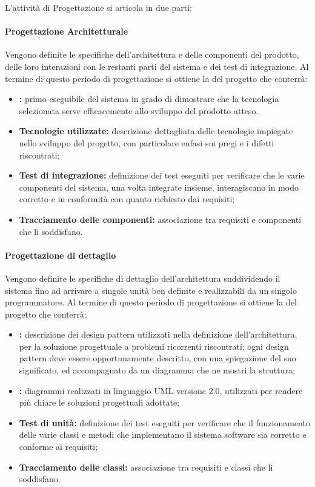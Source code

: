 L'attività di Progettazione si articola in due parti: 
\paragraph*{Progettazione Architetturale} 
Vengono definite le specifiche dell'architettura e delle componenti del prodotto, delle loro interazioni con le restanti parti del sistema e dei test di integrazione. Al termine di questo periodo di progettazione si ottiene la \textit{} del progetto che conterrà: 
\begin{itemize}
	\item \textbf{:} primo eseguibile del sistema in grado di dimostrare che la tecnologia selezionata serve efficacemente allo sviluppo del prodotto atteso.
	\item \textbf{Tecnologie utilizzate:} descrizione dettagliata delle tecnologie impiegate nello sviluppo del progetto, con particolare enfasi sui pregi e i difetti riscontrati;
	\item \textbf{Test di integrazione:} definizione dei test eseguiti per verificare che le varie componenti del sistema, una volta integrate insieme, interagiscano in modo corretto e in conformità con quanto richiesto dai requisiti;
	\item \textbf{Tracciamento delle componenti:} associazione tra requisiti e componenti che li soddisfano.
\end{itemize}

\paragraph*{Progettazione di dettaglio}
Vengono definite le specifiche di dettaglio dell'architettura suddividendo il sistema fino ad arrivare a singole unità ben definite e realizzabili da un singolo programmatore. Al termine di questo periodo di progettazione si ottiene la \textit{} del progetto che conterrà: 
\begin{itemize}
	\item \textbf{:} descrizione dei design pattern utilizzati nella definizione dell'architettura, per la soluzione progettuale a problemi ricorrenti riscontrati; ogni design pattern deve essere opportunamente descritto, con una spiegazione del suo significato, ed accompagnato da un diagramma che ne mostri la struttura;
	\item \textbf{:} diagrammi realizzati in linguaggio UML versione 2.0, utilizzati per rendere più chiare le soluzioni progettuali adottate; 
	\item \textbf{Test di unità:} definizione dei test eseguiti per verificare che il funzionamento delle varie classi e metodi che implementano il sistema software sia corretto e conforme ai requisiti;
	\item \textbf{Tracciamento delle classi:} associazione tra requisiti e classi che li soddisfano.
\end{itemize}


